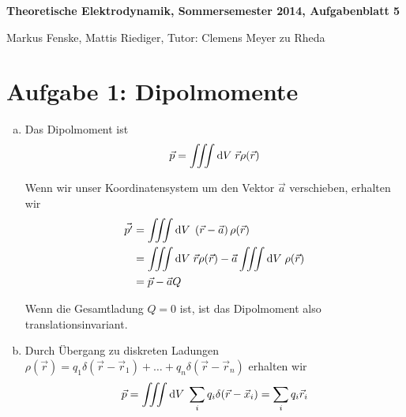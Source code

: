 \documentclass[a4paper,german,12pt,smallheadings]{scrartcl}
\begin{document}
\allowdisplaybreaks %
\begin{center}
\bfseries %
\sffamily %
\vspace{-40pt}
Theoretische Elektrodynamik, Sommersemester 2014, Aufgabenblatt 5

Markus Fenske, Mattis Riediger, Tutor: Clemens Meyer zu Rheda
\vspace{-10pt}
\end{center}

\section*{Aufgabe 1: Dipolmomente}
\begin{enumerate}[a)]
  \item
    Das Dipolmoment ist
    \begin{equation}
      \vec{p} = \iiint \dif V \; \vec{r} \rho(\vec{r})
    \end{equation}

    Wenn wir unser Koordinatensystem um den Vektor $\vec{a}$ verschieben,
    erhalten wir
    \begin{align}
      \vec{p'} &= \iiint \dif V \; \del{\vec{r} - \vec{a}} \rho(\vec{r}) \\
               &= \iiint \dif V \; \vec{r} \rho(\vec{r}) - \vec{a} \iiint \dif V \; \rho(\vec{r}) \\
               &= \vec{p} - \vec{a} Q
    \end{align}

    Wenn die Gesamtladung $Q = 0$ ist, ist das Dipolmoment also translationsinvariant.
  \item
    Durch Übergang zu diskreten Ladungen $\rho(\vec{r}) = q_1\delta(\vec{r} -
    \vec{r}_1) + \dots + q_n\delta(\vec{r} - \vec{r}_n)$ erhalten wir
    \begin{equation}
      \vec{p} = \iiint \dif V \; \sum_i q_i \delta(\vec{r} - \vec{x}_i) = \sum_i q_i \vec{r}_i
    \end{equation}


\end{enumerate}
\end{document}
